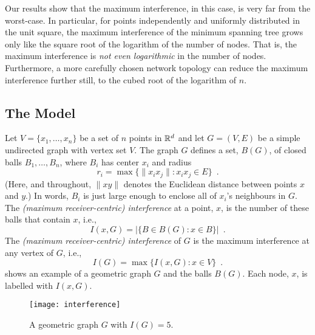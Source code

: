 \documentclass{patmorin}
\begin{document}
Our results show that the maximum interference, in this case, is very
far from the worst-case.  In particular, for points independently and
uniformly distributed in the unit square, the maximum interference of the
minimum spanning tree grows only like the square root of the logarithm
of the number of nodes.  That is, the maximum interference is \emph{not
even logarithmic} in the number of nodes.  Furthermore, a more carefully
chosen network topology can reduce the maximum interference further still,
to the cubed root of the logarithm of $n$.

\subsection{The Model}

Let $V=\{x_1,\ldots,x_n\}$ be a set of $n$ points in $\mathbb{R}^d$ and let
$G=(V,E)$ be a simple undirected graph with vertex set $V$.  The graph
$G$ defines a set, $B(G)$, of closed balls $B_1,\ldots,B_n$, where $B_i$
has center $x_i$ and radius
\[
   r_i = \max\{\|x_ix_j\| : x_ix_j\in E\} \enspace .
\]
(Here, and throughout, $\|xy\|$ denotes the Euclidean distance between
points $x$ and $y$.)  In words, $B_i$ is just large enough to enclose
all of $x_i$'s neighbours in $G$.  The \emph{(maximum receiver-centric)
interference} at a point, $x$, is the number of these balls that contain
$x$, i.e.,
\[
    I(x,G) = |\{B\in B(G) : x\in B\}| \enspace .
\]
The \emph{(maximum receiver-centric) interference} of $G$ is the maximum
interference at any vertex of $G$, i.e.,
\[
   I(G) = \max\{I(x,G) : x\in V\} \enspace .
\]
 shows an example of a geometric graph $G$ and the
balls $B(G)$.  Each node, $x$, is labelled with $I(x,G)$.

\begin{figure*}
  \begin{center}
    \texttt{[image: interference]}
  \end{center}
  \caption{A geometric graph $G$ with $I(G)=5$.}
\end{figure*}
\end{document}
